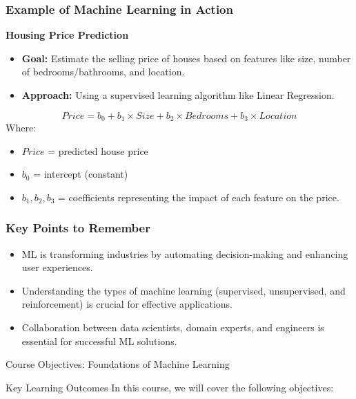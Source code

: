 \documentclass[aspectratio=169]{beamer}
\begin{document}
\begin{frame}[fragile]
    \frametitle{Example of Machine Learning in Action}
    \textbf{Housing Price Prediction}
    \begin{itemize}
        \item \textbf{Goal:} Estimate the selling price of houses based on features like size, number of bedrooms/bathrooms, and location.
        \item \textbf{Approach:} Using a supervised learning algorithm like Linear Regression.
    \end{itemize} 

    \begin{equation}
    Price = b_0 + b_1 \times Size + b_2 \times Bedrooms + b_3 \times Location
    \end{equation}
    Where:
    \begin{itemize}
        \item \(Price\) = predicted house price
        \item \(b_0\) = intercept (constant)
        \item \(b_1, b_2, b_3\) = coefficients representing the impact of each feature on the price.
    \end{itemize}
\end{frame}

\begin{frame}[fragile]
    \frametitle{Key Points to Remember}
    \begin{itemize}
        \item ML is transforming industries by automating decision-making and enhancing user experiences.
        \item Understanding the types of machine learning (supervised, unsupervised, and reinforcement) is crucial for effective applications.
        \item Collaboration between data scientists, domain experts, and engineers is essential for successful ML solutions.
    \end{itemize}
\end{frame}

\begin{frame}[fragile]{Course Objectives: Foundations of Machine Learning}
    \begin{block}{Key Learning Outcomes}
        In this course, we will cover the following objectives:
    \end{block}
\end{frame}
\end{document}

